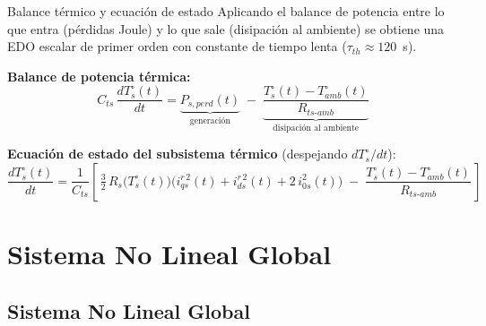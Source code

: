 \documentclass[aspectratio=169,t]{beamer}
\newcommand{\SecPresentacion}{Presentación del problema}
\newcommand{\SecMecanico}{Subsistema mecánico equivalente}
\newcommand{\SecElectromagnetico}{Subsistema electromagnético en coordenadas qd0}
\newcommand{\SecTermico}{Subsistema térmico}
\newcommand{\SecNLGlobal}{Sistema No Lineal Global}
\newcommand{\SecLPV}{Linealización Jacobiana (LPV)}
\newcommand{\SecLTI}{Obtención del modelo LTI equivalente}
\newcommand{\SecAnalisisLTI}{Análisis del modelo LTI aumentado}
\newcommand{\SecDinamica}{Respuesta dinámica en dominio del tiempo}
\newcommand{\SecControlador}{Diseño y análisis del controlador en cascada}
\newcommand{\SecVerifSpecs}{Verificación de desempeño: Especificaciones de operación}
\newcommand{\SecVerifOffset}{Verificación de desempeño: Offset de estado estacionario}
\newcommand{\SecVerifNoIdealidades}{Verificación de desempeño: No idealidades y comportamiento térmico}
\newcommand{\SecDiscretizacion}{Discretización del controlador}
\newcommand{\SecSoftware}{Codificación del software de control}
\newcommand{\AgendaItem}[3]{%
  \ifnum#1=#2
    {\scriptsize\bfseries\color{uncBlue}%
      \hyperlink{sec:#1}{\makebox[2.2em][r]{#1.}\hspace{0.7em}%
      \parbox[t]{0.86\textwidth}{#3}}\par}%
  \else
    {\scriptsize\color{black!26}%
      \hyperlink{sec:#1}{\makebox[2.2em][r]{#1.}\hspace{0.7em}%
      \parbox[t]{0.86\textwidth}{#3}}\par}%
  \fi
  \vspace{0.35mm}%
}
\newcommand{\AgendaBody}[1]{%
    \vspace{3mm}
    {\Large\bfseries\color{uncBlue}Tabla de contenidos\par}
    \vspace{2mm}
    \begin{minipage}{0.94\textwidth}
      \AgendaItem{1}{#1}{\SecPresentacion}
      \AgendaItem{2}{#1}{\SecMecanico}
      \AgendaItem{3}{#1}{\SecElectromagnetico}
      \AgendaItem{4}{#1}{\SecTermico}
      \AgendaItem{5}{#1}\SecNLGlobal
      \AgendaItem{6}{#1}{\SecLPV}
      \AgendaItem{7}{#1}{\SecLTI}
      \AgendaItem{8}{#1}{\SecAnalisisLTI}
      \AgendaItem{9}{#1}{\SecDinamica}
      \AgendaItem{10}{#1}{\SecControlador}
      \AgendaItem{11}{#1}{\SecVerifSpecs}
      \AgendaItem{12}{#1}{\SecVerifOffset}
      \AgendaItem{13}{#1}{\SecVerifNoIdealidades}
      \AgendaItem{14}{#1}{\SecDiscretizacion}
      \AgendaItem{15}{#1}{\SecSoftware}
    \end{minipage}
    \vfill
}
\newcommand{\AgendaSlideTarget}[2]{%
  \begin{frame}[plain]
    \hypertarget{#2}{}%
    \AgendaBody{#1}
  \end{frame}
}
\newcommand{\StartProjectSection}[2]{%
  \section{#2}%
  \subsection{#2}%
  \AgendaSlideTarget{#1}{sec:#1}%
}
\begin{document}
\begin{frame}{Balance térmico y ecuación de estado}
{\small\color{uncGray}Aplicando el balance de potencia entre lo que entra (pérdidas Joule) y lo que sale (disipación al ambiente) se obtiene una EDO escalar de primer orden con constante de tiempo lenta ($\tau_{th}\approx 120$~s).}\par
\vspace{3mm}

\textbf{Balance de potencia térmica:}
\begin{equation*}
C_{ts}\,\frac{dT_s^\circ(t)}{dt} = \underbrace{P_{s,perd}(t)}_{\text{generación}} \;-\; \underbrace{\frac{T_s^\circ(t) - T_{amb}^\circ(t)}{R_{ts\text{-}amb}}}_{\text{disipación al ambiente}}
\end{equation*}

\textbf{Ecuación de estado del subsistema térmico} (despejando $dT_s^\circ/dt$):
\begin{equation*}
\frac{dT_s^\circ(t)}{dt} = \frac{1}{C_{ts}}\!\left[\,\tfrac{3}{2}\,R_s\!\big(T_s^\circ(t)\big)\big(i_{qs}^{r\,2}(t)+i_{ds}^{r\,2}(t)+2\,i_{0s}^{2}(t)\big) \;-\; \frac{T_s^\circ(t) - T_{amb}^\circ(t)}{R_{ts\text{-}amb}}\,\right]
\end{equation*}

\end{frame}
\StartProjectSection{5}{\SecNLGlobal}
\end{document}
